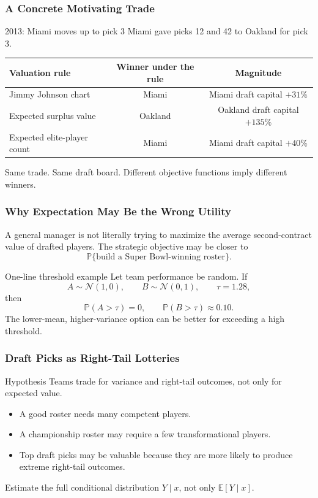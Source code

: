 \documentclass[aspectratio=169,professionalfonts]{beamer}
\newcommand{\E}{\mathbb{E}}
\newcommand{\Prb}{\mathbb{P}}
\newcommand{\Normal}{\mathcal{N}}
\begin{document}
\begin{frame}
\frametitle{A Concrete Motivating Trade}
\begin{block}{2013: Miami moves up to pick 3}
Miami gave picks 12 and 42 to Oakland for pick 3.
\end{block}

\begin{center}
\begin{tabular}{lcc}
\toprule
Valuation rule & Winner under the rule & Magnitude\\
\midrule
Jimmy Johnson chart & Miami & Miami draft capital $+31\%$\\
Expected surplus value & Oakland & Oakland draft capital $+135\%$\\
Expected elite-player count & Miami & Miami draft capital $+40\%$\\
\bottomrule
\end{tabular}
\end{center}

\vspace{2mm}
\small
Same trade. Same draft board. Different objective functions imply different winners.
\end{frame}

\begin{frame}
\frametitle{Why Expectation May Be the Wrong Utility}
A general manager is not literally trying to maximize the average second-contract value of drafted players. The strategic objective may be closer to
\[
  \Prb\{\text{build a Super Bowl-winning roster}\}.
\]

\begin{block}{One-line threshold example}
Let team performance be random. If
\[
A\sim \Normal(1,0),\qquad B\sim \Normal(0,1),\qquad \tau=1.28,
\]
then
\[
\Prb(A>\tau)=0,\qquad \Prb(B>\tau)\approx 0.10.
\]
The lower-mean, higher-variance option can be better for exceeding a high threshold.
\end{block}
\end{frame}

\begin{frame}
\frametitle{Draft Picks as Right-Tail Lotteries}
\begin{block}{Hypothesis}
Teams trade for variance and right-tail outcomes, not only for expected value.
\end{block}

\begin{itemize}
  \item A good roster needs many competent players.
  \item A championship roster may require a few transformational players.
  \item Top draft picks may be valuable because they are more likely to produce extreme right-tail outcomes.
\end{itemize}

\vspace{2mm}
\begin{center}
\Large
Estimate the \alert{full conditional distribution} $Y\mid x$, not only $\E[Y\mid x]$.
\end{center}
\end{frame}
\end{document}
